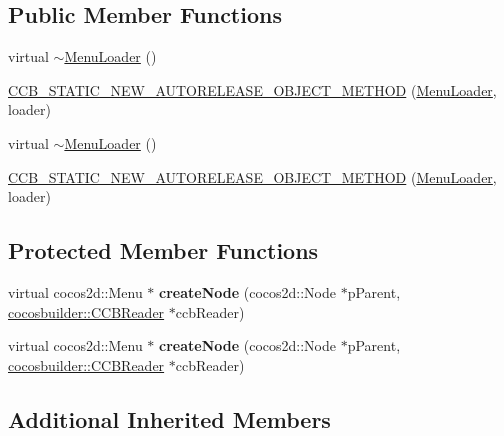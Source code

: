 \subsection*{Public Member Functions}
\begin{DoxyCompactItemize}
\item 
virtual \hyperlink{classcocosbuilder_1_1MenuLoader_a9c6f7d50bf15ac71365e142a2a3ba7c9}{$\sim$\+Menu\+Loader} ()
\item 
\hyperlink{classcocosbuilder_1_1MenuLoader_aba7f3bf59687618b4eebc5639c916fb8}{C\+C\+B\+\_\+\+S\+T\+A\+T\+I\+C\+\_\+\+N\+E\+W\+\_\+\+A\+U\+T\+O\+R\+E\+L\+E\+A\+S\+E\+\_\+\+O\+B\+J\+E\+C\+T\+\_\+\+M\+E\+T\+H\+OD} (\hyperlink{classcocosbuilder_1_1MenuLoader}{Menu\+Loader}, loader)
\item 
virtual \hyperlink{classcocosbuilder_1_1MenuLoader_a9c6f7d50bf15ac71365e142a2a3ba7c9}{$\sim$\+Menu\+Loader} ()
\item 
\hyperlink{classcocosbuilder_1_1MenuLoader_aba7f3bf59687618b4eebc5639c916fb8}{C\+C\+B\+\_\+\+S\+T\+A\+T\+I\+C\+\_\+\+N\+E\+W\+\_\+\+A\+U\+T\+O\+R\+E\+L\+E\+A\+S\+E\+\_\+\+O\+B\+J\+E\+C\+T\+\_\+\+M\+E\+T\+H\+OD} (\hyperlink{classcocosbuilder_1_1MenuLoader}{Menu\+Loader}, loader)
\end{DoxyCompactItemize}
\subsection*{Protected Member Functions}
\begin{DoxyCompactItemize}
\item 
\mbox{\label{classcocosbuilder_1_1MenuLoader_a0162161b8f52a85b7d65ac600560de60}} 
virtual cocos2d\+::\+Menu $\ast$ {\bfseries create\+Node} (cocos2d\+::\+Node $\ast$p\+Parent, \hyperlink{classcocosbuilder_1_1CCBReader}{cocosbuilder\+::\+C\+C\+B\+Reader} $\ast$ccb\+Reader)
\item 
\mbox{\label{classcocosbuilder_1_1MenuLoader_a0162161b8f52a85b7d65ac600560de60}} 
virtual cocos2d\+::\+Menu $\ast$ {\bfseries create\+Node} (cocos2d\+::\+Node $\ast$p\+Parent, \hyperlink{classcocosbuilder_1_1CCBReader}{cocosbuilder\+::\+C\+C\+B\+Reader} $\ast$ccb\+Reader)
\end{DoxyCompactItemize}
\subsection*{Additional Inherited Members}


